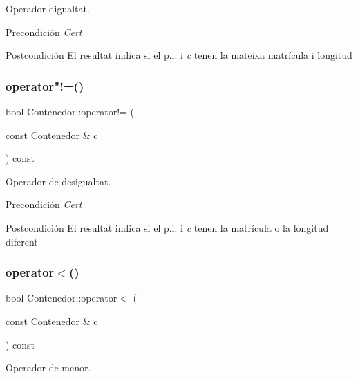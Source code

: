 Operador d\textquotesingle{}igualtat. 

\begin{DoxyPrecond}{Precondición}
{\itshape Cert} 
\end{DoxyPrecond}
\begin{DoxyPostcond}{Postcondición}
El resultat indica si el p.\+i. i {\itshape c} tenen la mateixa matrícula i longitud 
\end{DoxyPostcond}
\mbox{\label{class_contenedor_a740ea02e3530462a00f8a6ce18b2bf9c}} 
\subsubsection{\texorpdfstring{operator"!=()}{operator!=()}}
{\footnotesize\ttfamily bool Contenedor\+::operator!= (\begin{DoxyParamCaption}\item[{const \hyperlink{class_contenedor}{Contenedor} \&}]{c }\end{DoxyParamCaption}) const}



Operador de desigualtat. 

\begin{DoxyPrecond}{Precondición}
{\itshape Cert} 
\end{DoxyPrecond}
\begin{DoxyPostcond}{Postcondición}
El resultat indica si el p.\+i. i {\itshape c} tenen la matrícula o la longitud diferent 
\end{DoxyPostcond}
\mbox{\label{class_contenedor_a9d590c94118fcc15af16ba5a6be35d09}} 
\subsubsection{\texorpdfstring{operator$<$()}{operator<()}}
{\footnotesize\ttfamily bool Contenedor\+::operator$<$ (\begin{DoxyParamCaption}\item[{const \hyperlink{class_contenedor}{Contenedor} \&}]{c }\end{DoxyParamCaption}) const}



Operador de menor. 

